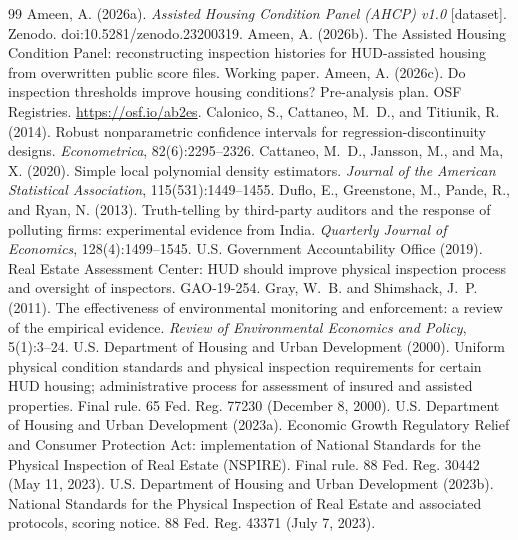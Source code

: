 \documentclass[11pt,letterpaper]{article}
\begin{document}
\begin{thebibliography}{99}\small\setlength{\itemsep}{0.1ex}
 Ameen, A. (2026a). \emph{Assisted Housing Condition Panel (AHCP) v1.0} [dataset]. Zenodo. doi:10.5281/zenodo.23200319.
 Ameen, A. (2026b). The Assisted Housing Condition Panel: reconstructing inspection histories for HUD-assisted housing from overwritten public score files. Working paper.
 Ameen, A. (2026c). Do inspection thresholds improve housing conditions? Pre-analysis plan. OSF Registries. \url{https://osf.io/ab2es}.
 Calonico, S., Cattaneo, M.~D., and Titiunik, R. (2014). Robust nonparametric confidence intervals for regression-discontinuity designs. \emph{Econometrica}, 82(6):2295--2326.
 Cattaneo, M.~D., Jansson, M., and Ma, X. (2020). Simple local polynomial density estimators. \emph{Journal of the American Statistical Association}, 115(531):1449--1455.
 Duflo, E., Greenstone, M., Pande, R., and Ryan, N. (2013). Truth-telling by third-party auditors and the response of polluting firms: experimental evidence from India. \emph{Quarterly Journal of Economics}, 128(4):1499--1545.
 U.S. Government Accountability Office (2019). Real Estate Assessment Center: HUD should improve physical inspection process and oversight of inspectors. GAO-19-254.
 Gray, W.~B. and Shimshack, J.~P. (2011). The effectiveness of environmental monitoring and enforcement: a review of the empirical evidence. \emph{Review of Environmental Economics and Policy}, 5(1):3--24.
 U.S. Department of Housing and Urban Development (2000). Uniform physical condition standards and physical inspection requirements for certain HUD housing; administrative process for assessment of insured and assisted properties. Final rule. 65 Fed. Reg. 77230 (December 8, 2000).
 U.S. Department of Housing and Urban Development (2023a). Economic Growth Regulatory Relief and Consumer Protection Act: implementation of National Standards for the Physical Inspection of Real Estate (NSPIRE). Final rule. 88 Fed. Reg. 30442 (May 11, 2023).
 U.S. Department of Housing and Urban Development (2023b). National Standards for the Physical Inspection of Real Estate and associated protocols, scoring notice. 88 Fed. Reg. 43371 (July 7, 2023).

\end{thebibliography}
\end{document}
